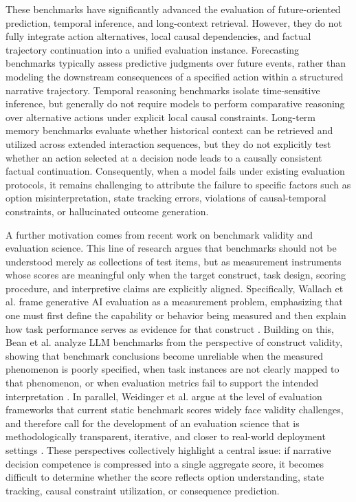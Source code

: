 \documentclass[pdflatex,sn-mathphys-num]{sn-jnl}%
\theoremstyle{thmstyleone}%
\theoremstyle{thmstyletwo}%
\theoremstyle{thmstylethree}%
\begin{document}
These benchmarks have significantly advanced the evaluation of future-oriented prediction, temporal inference, and long-context retrieval. However, they do not fully integrate action alternatives, local causal dependencies, and factual trajectory continuation into a unified evaluation instance. Forecasting benchmarks typically assess predictive judgments over future events, rather than modeling the downstream consequences of a specified action within a structured narrative trajectory. Temporal reasoning benchmarks isolate time-sensitive inference, but generally do not require models to perform comparative reasoning over alternative actions under explicit local causal constraints. Long-term memory benchmarks evaluate whether historical context can be retrieved and utilized across extended interaction sequences, but they do not explicitly test whether an action selected at a decision node leads to a causally consistent factual continuation. Consequently, when a model fails under existing evaluation protocols, it remains challenging to attribute the failure to specific factors such as option misinterpretation, state tracking errors, violations of causal-temporal constraints, or hallucinated outcome generation.

A further motivation comes from recent work on benchmark validity and evaluation science. This line of research argues that benchmarks should not be understood merely as collections of test items, but as measurement instruments whose scores are meaningful only when the target construct, task design, scoring procedure, and interpretive claims are explicitly aligned. Specifically, Wallach et al. frame generative AI evaluation as a measurement problem, emphasizing that one must first define the capability or behavior being measured and then explain how task performance serves as evidence for that construct \cite{wallach2025position}. Building on this, Bean et al. analyze LLM benchmarks from the perspective of construct validity, showing that benchmark conclusions become unreliable when the measured phenomenon is poorly specified, when task instances are not clearly mapped to that phenomenon, or when evaluation metrics fail to support the intended interpretation \cite{bean2025measuring}. In parallel, Weidinger et al. argue at the level of evaluation frameworks that current static benchmark scores widely face validity challenges, and therefore call for the development of an evaluation science that is methodologically transparent, iterative, and closer to real-world deployment settings \cite{weidinger2025evaluation}. These perspectives collectively highlight a central issue: if narrative decision competence is compressed into a single aggregate score, it becomes difficult to determine whether the score reflects option understanding, state tracking, causal constraint utilization, or consequence prediction.
\end{document}
